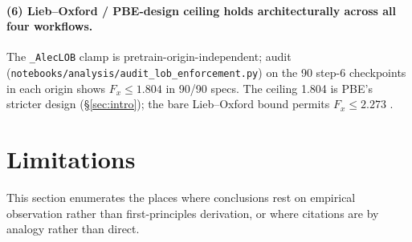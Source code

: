\documentclass[11pt,letterpaper]{article}
\begin{document}
\paragraph{(6) Lieb--Oxford / PBE-design ceiling holds architecturally across all four
workflows.} The \texttt{\_AlecLOB} clamp is pretrain-origin-independent;
audit (\texttt{notebooks/analysis/audit\_lob\_enforcement.py}) on the 90 step-6
checkpoints in each origin shows $F_x \le 1.804$ in 90/90 specs. The ceiling 1.804 is
PBE's stricter design (\S\ref{sec:intro}); the bare Lieb--Oxford bound permits
$F_x \le 2.273$ \citep{LiebOxford1981, PerdewBurkeErnzerhof1996}.

\section{Limitations}
\label{sec:limits}

This section enumerates the places where conclusions rest on empirical observation
rather than first-principles derivation, or where citations are by analogy rather than
direct.
\end{document}

